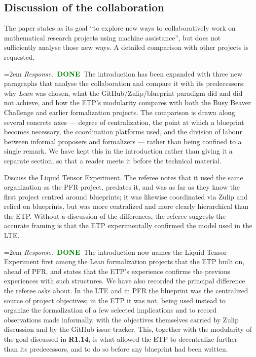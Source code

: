 \documentclass[11pt]{amsart}
\newcommand{\done}{\textcolor{green}{\textbf{DONE}}}
\newcommand{\response}[1]{%
  \par\smallskip
  \noindent\hangindent=2em\hangafter=1
  \textit{Response.}\ #1
  \par\smallskip}
\begin{document}
\subsection*{Discussion of the collaboration}

\begin{requests}[resume]

\item The paper states as its goal ``to explore new ways to collaboratively work on
mathematical research projects using machine assistance'', but does not sufficiently
analyse those new ways. A detailed comparison with other projects is requested.
\response{\done\ The introduction has been expanded with three new paragraphs that analyse
the collaboration and compare it with its predecessors: why \emph{Lean} was chosen, what
the GitHub/Zulip/blueprint paradigm did and did not achieve, and how the ETP's modularity
compares with both the Busy Beaver Challenge and earlier formalization projects. The
comparison is drawn along several concrete axes --- degree of centralization, the point at
which a blueprint becomes necessary, the coordination platforms used, and the division of
labour between informal proposers and formalizers --- rather than being confined to a
single remark. We have kept this in the introduction rather than giving it a separate
section, so that a reader meets it before the technical material.}

\item Discuss the Liquid Tensor Experiment. The referee notes that it used the same
organization as the PFR project, predates it, and was as far as they know the first
project centred around blueprints; it was likewise coordinated via Zulip and relied
on blueprints, but was more centralized and more clearly hierarchical than the ETP.
Without a discussion of the differences, the referee suggests the accurate framing is
that the ETP experimentally confirmed the model used in the LTE.
\response{\done\ The introduction now names the Liquid Tensor Experiment first among the Lean
formalization projects that the ETP built on, ahead of PFR, and states that the ETP's
experience confirms the previous experiences with such structures. We have also recorded
the principal difference the referee asks about. In the LTE and in PFR the blueprint was
the centralized source of project objectives; in the ETP it was not, being used instead to
organize the formalization of a few selected implications and to record observations made
informally, with the objectives themselves carried by Zulip discussion and by the GitHub
issue tracker. This, together with the modularity of the goal discussed in \textbf{R1.14},
is what allowed the ETP to decentralize further than its predecessors, and to do so before
any blueprint had been written.}


\end{requests}
\end{document}
